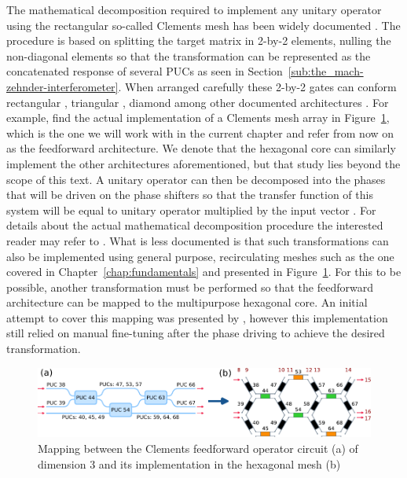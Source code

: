 The mathematical decomposition required to implement any unitary operator using the rectangular so-called Clements mesh has been widely documented \cite{clements_optimal_2016, capmany_programmable_2020}.
The procedure is based on splitting the target matrix in 2-by-2 elements, nulling the non-diagonal elements so that the transformation can be represented as the concatenated response of several PUCs as seen in Section~\ref{sub:the_mach-zehnder-interferometer}.
When arranged carefully these 2-by-2 gates can conform rectangular \cite{clements_optimal_2016}, triangular \cite{reck_experimental_1994}, diamond \cite{shokraneh_diamond_2020} among other documented architectures \cite{miller_self-configuring_2013}.
For example, find the actual implementation of a Clements mesh array in Figure~\ref{fig:ch4-mapping_feedforward}, which is the one we will work with in the current chapter and refer from now on as the feedforward architecture.
We denote that the hexagonal core can similarly implement the other architectures aforementioned, but that study lies beyond the scope of this text.
A unitary operator can then be decomposed into the phases that will be driven on the phase shifters so that the transfer function of this system will be equal to unitary operator multiplied by the input vector \cite{taballione_universal_2021, arrazola_quantum_2021, ruocco_demonstration_2016}.
For details about the actual mathematical decomposition procedure the interested reader may refer to \cite{clements_optimal_2016, capmany_programmable_2020}.
What is less documented is that such transformations can also be implemented using general purpose, recirculating meshes such as the one covered in Chapter~\ref{chap:fundamentals} and presented in Figure~\ref{fig:ch4-mapping_feedforward}.
For this to be possible, another transformation must be performed so that the feedforward architecture can be mapped to the multipurpose hexagonal core.
An initial attempt to cover this mapping was presented by \cite{perez_silicon_2017}, however this implementation still relied on manual fine-tuning after the phase driving to achieve the desired transformation.

\begin{figure}[h!]
	\begin{center}
		\includegraphics{figures/ch4-mapping_feedforward.pdf}
	\end{center}
	\caption{Mapping between the Clements \cite{clements_optimal_2016} feedforward operator circuit (a) of dimension 3 and its implementation in the hexagonal mesh (b)}\label{fig:ch4-mapping_feedforward}
\end{figure}

